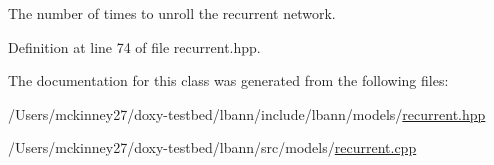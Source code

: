 The number of times to unroll the recurrent network. 

Definition at line 74 of file recurrent.\+hpp.



The documentation for this class was generated from the following files\+:\begin{DoxyCompactItemize}
\item 
/\+Users/mckinney27/doxy-\/testbed/lbann/include/lbann/models/\hyperlink{recurrent_8hpp}{recurrent.\+hpp}\item 
/\+Users/mckinney27/doxy-\/testbed/lbann/src/models/\hyperlink{recurrent_8cpp}{recurrent.\+cpp}\end{DoxyCompactItemize}
